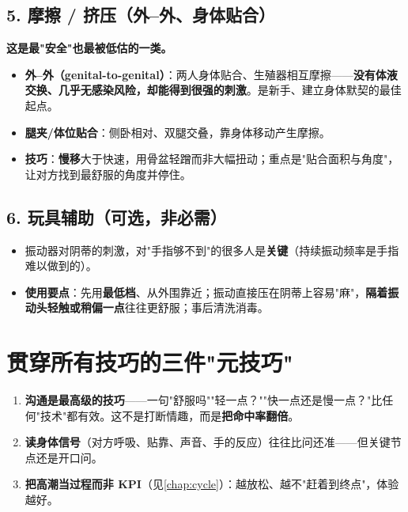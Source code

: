 \subsection*{5. 摩擦 / 挤压（外--外、身体贴合）}

\textbf{这是最"安全"也最被低估的一类。}

\begin{itemize}[leftmargin=2em,itemsep=0.3em]
  \item \textbf{外--外（genital-to-genital）}：两人身体贴合、生殖器相互摩擦——\textbf{没有体液交换、几乎无感染风险，却能得到很强的刺激}。是新手、建立身体默契的最佳起点。
  \item \textbf{腿夹/体位贴合}：侧卧相对、双腿交叠，靠身体移动产生摩擦。
  \item \textbf{技巧}：\textbf{慢移}大于快速，用骨盆轻蹭而非大幅扭动；重点是"贴合面积与角度"，让对方找到最舒服的角度并停住。
\end{itemize}

\subsection*{6. 玩具辅助（可选，非必需）}

\begin{itemize}[leftmargin=2em,itemsep=0.3em]
  \item 振动器对阴蒂的刺激，对"手指够不到"的很多人是\textbf{关键}（持续振动频率是手指难以做到的）。
  \item \textbf{使用要点}：先用\textbf{最低档}、从外围靠近；振动直接压在阴蒂上容易"麻"，\textbf{隔着振动头轻触或稍偏一点}往往更舒服；事后清洗消毒。
\end{itemize}

\section{贯穿所有技巧的三件"元技巧"}

\begin{enumerate}[leftmargin=2em,itemsep=0.3em]
  \item \textbf{沟通是最高级的技巧}——一句"舒服吗""轻一点？""快一点还是慢一点？"比任何"技术"都有效。这不是打断情趣，而是\textbf{把命中率翻倍}。
  \item \textbf{读身体信号}（对方呼吸、贴靠、声音、手的反应）往往比问还准——但关键节点还是开口问。
  \item \textbf{把高潮当过程而非 KPI}（见\ref{chap:cycle}）：越放松、越不"赶着到终点"，体验越好。
\end{enumerate}

